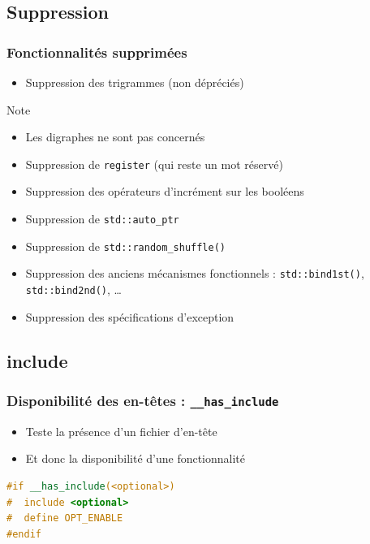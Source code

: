 \documentclass[C++.tex]{subfiles}
\begin{document}
\subsection*{Suppression}
\begin{frame}[fragile]
	\frametitle{Fonctionnalités supprimées}
	\begin{itemize}
		\item Suppression des trigrammes (non dépréciés)
	\end{itemize}

	\begin{block}{Note}
		\begin{itemize}
			\item Les digraphes ne sont pas concernés
		\end{itemize}
	\end{block}

	\begin{itemize}
		\item Suppression de \lstinline|register| (qui reste un mot réservé)
		\item Suppression des opérateurs d'incrément sur les booléens


		\item Suppression de \lstinline|std::auto_ptr|
		\item Suppression de \lstinline|std::random_shuffle()|
		\item Suppression des anciens mécanismes fonctionnels : \lstinline|std::bind1st()|, \lstinline|std::bind2nd()|, \ldots
		\item Suppression des spécifications d'exception
	\end{itemize}
\end{frame}

\subsection*{include}
\begin{frame}[fragile]
	\frametitle{Disponibilité des en-têtes : \lstinline|__has_include|}
	\begin{itemize}
		\item Teste la présence d'un fichier d'en-tête
		\item Et donc la disponibilité d'une fonctionnalité
	\end{itemize}

	\begin{lstlisting}[language=C++]
#if __has_include(<optional>)
#  include <optional>
#  define OPT_ENABLE
#endif\end{lstlisting}
\end{frame}
\end{document}
